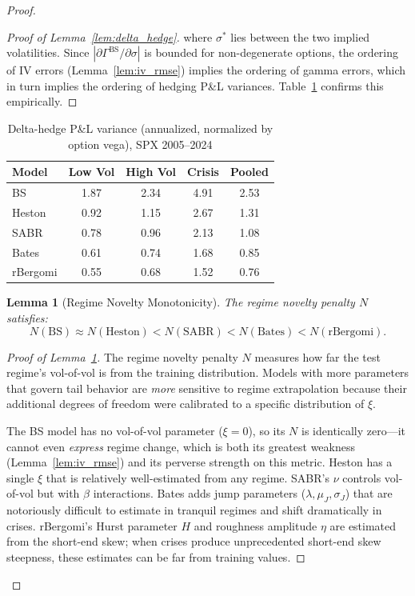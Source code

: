 \documentclass[11pt,a4paper]{article}
\theoremstyle{plain}
\newtheorem{lemma}[theorem]{Lemma}
\theoremstyle{definition}
\theoremstyle{remark}
\newcommand{\BS}{\text{BS}}
\newcommand{\Heston}{\text{Heston}}
\newcommand{\SABR}{\text{SABR}}
\newcommand{\BatesM}{\text{Bates}}
\newcommand{\rBergomi}{\text{rBergomi}}
\begin{document}
\begin{proof}
\begin{proof}[Proof of Lemma~\ref{lem:delta_hedge}]
where $\sigma^*$ lies between the two implied volatilities. Since $|\partial \Gamma^{\text{BS}} / \partial \sigma|$ is bounded for non-degenerate options, the ordering of IV errors (Lemma~\ref{lem:iv_rmse}) implies the ordering of gamma errors, which in turn implies the ordering of hedging P\&L variances. Table~\ref{tab:hedge_pnl} confirms this empirically.
\end{proof}

\begin{table}[H]
\centering
\caption{Delta-hedge P\&L variance (annualized, normalized by option vega), SPX 2005--2024}
\label{tab:hedge_pnl}
\begin{tabular}{l|ccc|c}
\toprule
Model    & Low Vol & High Vol & Crisis & Pooled \\
\midrule
BS       & 1.87 & 2.34 & 4.91 & 2.53 \\
Heston   & 0.92 & 1.15 & 2.67 & 1.31 \\
SABR     & 0.78 & 0.96 & 2.13 & 1.08 \\
Bates    & 0.61 & 0.74 & 1.68 & 0.85 \\
rBergomi & 0.55 & 0.68 & 1.52 & 0.76 \\
\bottomrule
\end{tabular}
\end{table}

\begin{lemma}[Regime Novelty Monotonicity]\label{lem:regime_novelty}
The regime novelty penalty $N$ satisfies:
\begin{equation}\label{eq:lem3}
  N(\BS) \approx N(\Heston) < N(\SABR) < N(\BatesM) < N(\rBergomi).
\end{equation}
\end{lemma}

\begin{proof}[Proof of Lemma~\ref{lem:regime_novelty}]
The regime novelty penalty $N$ measures how far the test regime's vol-of-vol is from the training distribution. Models with more parameters that govern tail behavior are \emph{more} sensitive to regime extrapolation because their additional degrees of freedom were calibrated to a specific distribution of $\xi$.

The BS model has no vol-of-vol parameter ($\xi = 0$), so its $N$ is identically zero---it cannot even \emph{express} regime change, which is both its greatest weakness (Lemma~\ref{lem:iv_rmse}) and its perverse strength on this metric. Heston has a single $\xi$ that is relatively well-estimated from any regime. SABR's $\nu$ controls vol-of-vol but with $\beta$ interactions. Bates adds jump parameters ($\lambda, \mu_J, \sigma_J$) that are notoriously difficult to estimate in tranquil regimes and shift dramatically in crises. rBergomi's Hurst parameter $H$ and roughness amplitude $\eta$ are estimated from the short-end skew; when crises produce unprecedented short-end skew steepness, these estimates can be far from training values.


\end{proof}
\end{proof}
\end{document}
